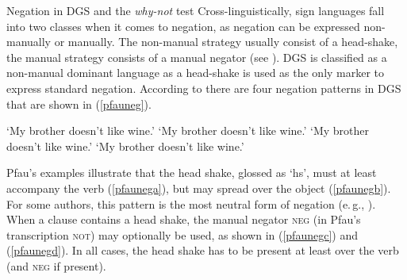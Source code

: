 \begin{digression}{Negation in DGS and the \textit{why-not} test}{}
\noindent Cross-linguistically, sign languages fall into two classes when it comes to negation, as negation can be expressed non-manually or manually. The non-manual strategy usually consist of a head-shake, the manual strategy consists of a manual negator (see \citealt{zeshan2004negation}). DGS is classified as a non-manual dominant language as a head-shake is used as the only marker to express standard negation. According to \citet[55]{pfau2016featural} there are four negation patterns in DGS that are shown in (\ref{pfauneg}). 


\begin{exe}
\ex\label{pfauneg}\begin{xlist} 
\ex {} 
\glt `My brother doesn't like wine.' \label{pfaunega}
\ex {} 
%
\glt `My brother doesn't like wine.' \label{pfaunegb}
\ex {} 
%
\glt `My brother doesn't like wine.' \label{pfaunegc}
\ex {} 
%
\glt `My brother doesn't like wine.' \label{pfaunegd}


\end{xlist}
\end{exe} 

\noindent Pfau's examples illustrate that the head shake, glossed as `hs', must at least accompany the verb (\ref{pfaunega}), but may spread over the object (\ref{pfaunegb}). For some authors, this pattern is the most neutral form of negation (e.\,g., \citealt{happ2014vork}). When a clause contains a head shake, the manual negator \textsc{neg} (in Pfau's transcription \textsc{not}) may optionally be used, as shown in (\ref{pfaunegc}) and (\ref{pfaunegd}). In all cases, the head shake has to be present at least over the verb (and \textsc{neg} if present).


\end{digression}
